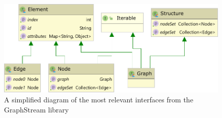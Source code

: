 \begin{figure}[ht]
\includegraphics[width=0.8\linewidth]{graphstream_diagram.pdf}
\caption{A simplified diagram of the most relevant interfaces from the GraphStream library}
\label{fig:graphstream_diagram}
\end{figure}

